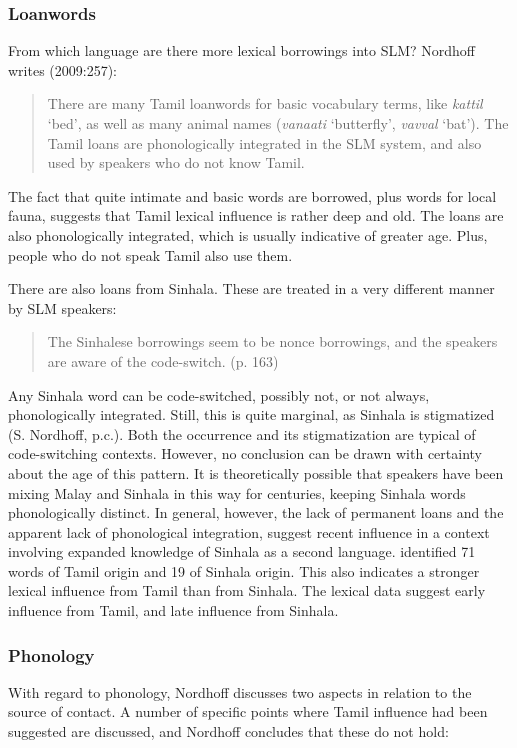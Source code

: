 \subsubsection{Loanwords}%
From which language are there more lexical borrowings into SLM? Nordhoff writes (2009:257):

\begin{quote}
There are many Tamil loanwords for basic vocabulary terms, like \textit{kattil} `bed', as well as many animal names (\textit{vanaati} `butterfly', \textit{vavval} `bat'). The Tamil loans are phonologically integrated in the SLM system, and also used by speakers who do not know Tamil.
\end{quote}

The fact that quite intimate and basic words are borrowed, plus words for local fauna, suggests that Tamil lexical influence is rather deep and old. The loans are also phonologically integrated, which is usually indicative of greater age. Plus, people who do not speak Tamil also use them. 

There are also loans from Sinhala. These are treated in a very different manner by SLM speakers:

\begin{quote}
The Sinhalese borrowings seem to be nonce borrowings, and the speakers are aware of the code-switch. (p. 163)
\end{quote}

Any Sinhala word can be code-switched, possibly not, or not always, phonologically integrated. Still, this is quite marginal, as Sinhala is stigmatized (S. Nordhoff, p.c.). Both the occurrence and its stigmatization are typical of code-switching contexts. However, no conclusion can be drawn with certainty about the age of this pattern. It is theoretically possible that speakers have been mixing Malay and Sinhala in this way for centuries, keeping Sinhala words phonologically distinct. In general, however, the lack of permanent loans and the apparent lack of phonological integration, suggest recent influence in a context involving expanded knowledge of Sinhala as a second language. \citet{Paauwtv} identified 71 words of Tamil origin and 19 of Sinhala origin. This also indicates a stronger lexical influence from Tamil than from Sinhala. The lexical data suggest early influence from Tamil, and late influence from Sinhala.

\subsubsection{Phonology}%
With regard to phonology, Nordhoff discusses two aspects in relation to the source of contact. A number of specific points where Tamil influence had been suggested are discussed, and Nordhoff concludes that these do not hold:

